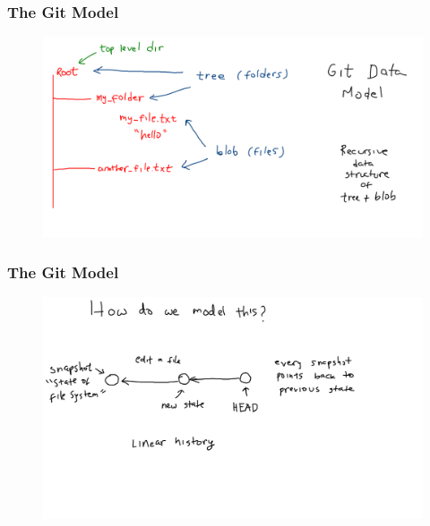 \documentclass[11pt]{beamer}
\begin{document}
\begin{frame}[fragile]
\frametitle{The Git Model}

\begin{figure}[htp]
 \centering
 \includegraphics[scale=0.2]{git_model_1.png}
\end{figure}

\end{frame}




\begin{frame}[fragile]
\frametitle{The Git Model}

\begin{figure}[htp]
 \centering
 \includegraphics[scale=0.2]{git_model_2a.png}
\end{figure}

\end{frame}


\end{document}
